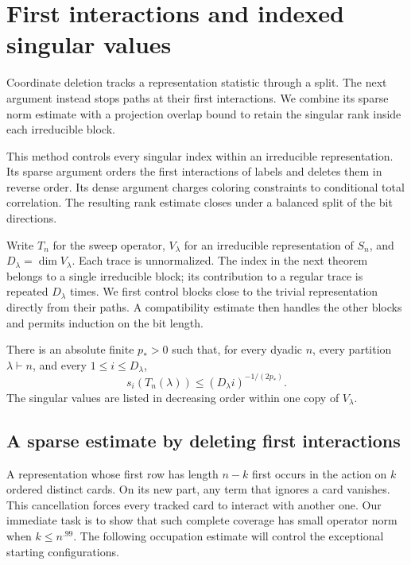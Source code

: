 \section{First interactions and indexed singular values}\label{tra:first-interactions}

Coordinate deletion tracks a representation statistic through a split. The next argument instead stops paths at their first interactions. We combine its sparse norm estimate with a projection overlap bound to retain the singular rank inside each irreducible block.

This method controls every singular index within an irreducible representation. Its sparse argument orders the first interactions of labels and deletes them in reverse order. Its dense argument charges coloring constraints to conditional total correlation. The resulting rank estimate closes under a balanced split of the bit directions.

Write $T_n$ for the sweep operator, $V_\lambda$ for an irreducible
representation of $S_n$, and $D_\lambda=\dim V_\lambda$. Each trace is
unnormalized. The index in the next theorem belongs to a single
irreducible block; its contribution to a regular trace is repeated
$D_\lambda$ times. We first control blocks close to the trivial
representation directly from their paths. A compatibility estimate
then handles the other blocks and permits induction on the bit length.

\begin{theorem}\label{tra:first-interactions:singular}

\label{tra:first-interactions:indexed-conclusion}
There is an absolute finite $p_*>0$ such that, for every dyadic
$n$, every partition $\lambda\vdash n$, and every $1\le i\le D_\lambda$,
\begin{equation}\label{tra:first-interactions:eq1}
 s_i(T_n(\lambda))\le(D_\lambda i)^{-1/(2p_*)}.
\end{equation}
The singular values are listed in decreasing order within one copy of
$V_\lambda$.

\end{theorem}

\subsection{A sparse estimate by deleting first interactions}

A representation whose first row has length $n-k$ first occurs in
the action on $k$ ordered distinct cards. On its new part, any term
that ignores a card vanishes. This cancellation forces every tracked
card to interact with another one. Our immediate task is to show
that such complete coverage has small operator norm when
$k\le n^{.99}$. The following occupation estimate will control the
exceptional starting configurations.

